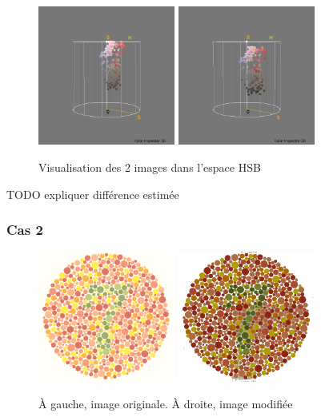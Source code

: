 \documentclass[a4paper]{article}
\begin{document}
\begin{figure}[H]
\begin{center}
\includegraphics[width=170px]{../resultats/e1_q1_k1_26.png}
\includegraphics[width=170px]{../resultats/e1_q1_k1_lumi.png}
\end{center}
\caption{Visualisation des 2 images dans l'espace HSB}
\end{figure}

TODO expliquer différence estimée

\clearpage
\subsubsection{Cas 2}

\begin{figure}[H]
\begin{center}
\includegraphics[width=170px]{../base/cas_2_dalton7.png}
\includegraphics[width=170px]{../base/cas_2_luminance.png}
\end{center}
\caption{À gauche, image originale. À droite, image modifiée}
\end{figure}
\end{document}
